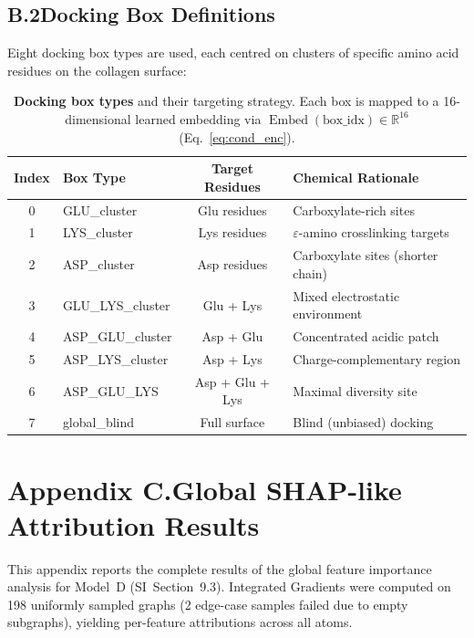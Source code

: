 \documentclass[11pt]{article}
\begin{document}
\subsection*{B.2\quad Docking Box Definitions}

Eight docking box types are used, each centred on clusters of specific
amino acid residues on the collagen surface:

\begin{table}[H]
\small
\centering
\caption{\textbf{Docking box types} and their targeting strategy.
  Each box is mapped to a 16-dimensional learned embedding via
  $\operatorname{Embed}(\text{box\_idx}) \in \mathbb{R}^{16}$
  (Eq.~\ref{eq:cond_enc}).}
\label{tab:app_boxes}
\begin{tabular}{clcl}
\toprule
\textbf{Index} & \textbf{Box Type} & \textbf{Target Residues}
  & \textbf{Chemical Rationale} \\
\midrule
0 & GLU\_cluster     & Glu residues & Carboxylate-rich sites \\
1 & LYS\_cluster     & Lys residues & $\varepsilon$-amino crosslinking targets \\
2 & ASP\_cluster     & Asp residues & Carboxylate sites (shorter chain) \\
3 & GLU\_LYS\_cluster & Glu + Lys    & Mixed electrostatic environment \\
4 & ASP\_GLU\_cluster & Asp + Glu    & Concentrated acidic patch \\
5 & ASP\_LYS\_cluster & Asp + Lys    & Charge-complementary region \\
6 & ASP\_GLU\_LYS    & Asp + Glu + Lys & Maximal diversity site \\
7 & global\_blind    & Full surface & Blind (unbiased) docking \\
\bottomrule
\end{tabular}
\end{table}

\label{app:ligands_end}

\section*{Appendix C.\quad Global SHAP-like Attribution Results}
\label{app:shap}

This appendix reports the complete results of the global feature
importance analysis for Model~D (SI~Section~9.3).
Integrated Gradients were computed on 198 uniformly sampled graphs
(2 edge-case samples failed due to empty subgraphs), yielding
per-feature attributions across all atoms.
\end{document}
